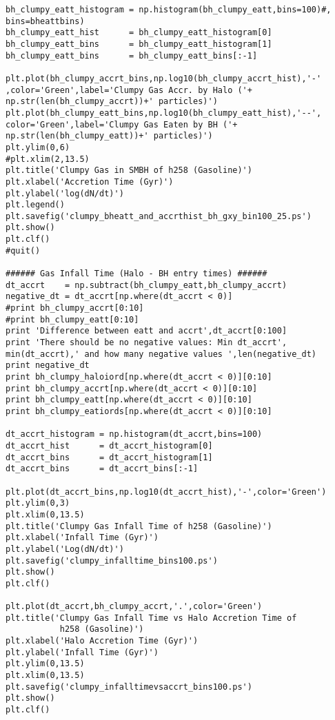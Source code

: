 \documentclass[12pt,headA,chapB]{fiskthesis}
\begin{document}
\begin{verbatim}
bh_clumpy_eatt_histogram = np.histogram(bh_clumpy_eatt,bins=100)#,
bins=bheattbins)
bh_clumpy_eatt_hist      = bh_clumpy_eatt_histogram[0]
bh_clumpy_eatt_bins      = bh_clumpy_eatt_histogram[1]
bh_clumpy_eatt_bins      = bh_clumpy_eatt_bins[:-1]

plt.plot(bh_clumpy_accrt_bins,np.log10(bh_clumpy_accrt_hist),'-'
,color='Green',label='Clumpy Gas Accr. by Halo ('+
np.str(len(bh_clumpy_accrt))+' particles)')
plt.plot(bh_clumpy_eatt_bins,np.log10(bh_clumpy_eatt_hist),'--',
color='Green',label='Clumpy Gas Eaten by BH ('+
np.str(len(bh_clumpy_eatt))+' particles)')
plt.ylim(0,6)
#plt.xlim(2,13.5)
plt.title('Clumpy Gas in SMBH of h258 (Gasoline)')
plt.xlabel('Accretion Time (Gyr)')
plt.ylabel('log(dN/dt)')
plt.legend()
plt.savefig('clumpy_bheatt_and_accrthist_bh_gxy_bin100_25.ps')
plt.show()
plt.clf()
#quit()

###### Gas Infall Time (Halo - BH entry times) ######
dt_accrt    = np.subtract(bh_clumpy_eatt,bh_clumpy_accrt)
negative_dt = dt_accrt[np.where(dt_accrt < 0)]
#print bh_clumpy_accrt[0:10]
#print bh_clumpy_eatt[0:10]
print 'Difference between eatt and accrt',dt_accrt[0:100]
print 'There should be no negative values: Min dt_accrt',
min(dt_accrt),' and how many negative values ',len(negative_dt)
print negative_dt
print bh_clumpy_haloiord[np.where(dt_accrt < 0)][0:10]
print bh_clumpy_accrt[np.where(dt_accrt < 0)][0:10]
print bh_clumpy_eatt[np.where(dt_accrt < 0)][0:10]
print bh_clumpy_eatiords[np.where(dt_accrt < 0)][0:10]

dt_accrt_histogram = np.histogram(dt_accrt,bins=100)
dt_accrt_hist      = dt_accrt_histogram[0]
dt_accrt_bins      = dt_accrt_histogram[1]
dt_accrt_bins      = dt_accrt_bins[:-1]

plt.plot(dt_accrt_bins,np.log10(dt_accrt_hist),'-',color='Green')
plt.ylim(0,3)
plt.xlim(0,13.5)
plt.title('Clumpy Gas Infall Time of h258 (Gasoline)')
plt.xlabel('Infall Time (Gyr)')
plt.ylabel('Log(dN/dt)')
plt.savefig('clumpy_infalltime_bins100.ps')
plt.show()
plt.clf()

plt.plot(dt_accrt,bh_clumpy_accrt,'.',color='Green')
plt.title('Clumpy Gas Infall Time vs Halo Accretion Time of 
           h258 (Gasoline)')
plt.xlabel('Halo Accretion Time (Gyr)')
plt.ylabel('Infall Time (Gyr)')
plt.ylim(0,13.5)
plt.xlim(0,13.5)
plt.savefig('clumpy_infalltimevsaccrt_bins100.ps')
plt.show()
plt.clf()
\end{verbatim}

\backmatter
\thispagestyle{empty}

\newpage
\end{document}
